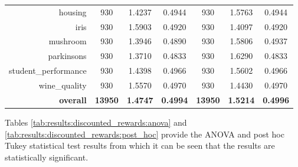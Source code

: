 \begin{table}[htbp]
{\begin{tabular}{rcccccc}
    housing & 930   & \cellcolor[rgb]{ .776,  .937,  .808}\textcolor[rgb]{ 0,  .38,  0}{1.4237} & 0.4944 & 930   & 1.5763 & 0.4944 \\
    iris  & 930   & 1.5903 & 0.4920 & 930   & \cellcolor[rgb]{ .776,  .937,  .808}\textcolor[rgb]{ 0,  .38,  0}{1.4097} & 0.4920 \\
    mushroom & 930   & \cellcolor[rgb]{ .776,  .937,  .808}\textcolor[rgb]{ 0,  .38,  0}{1.3946} & 0.4890 & 930   & 1.5806 & 0.4937 \\
    parkinsons & 930   & \cellcolor[rgb]{ .776,  .937,  .808}\textcolor[rgb]{ 0,  .38,  0}{1.3710} & 0.4833 & 930   & 1.6290 & 0.4833 \\
    student\_performance & 930   & \cellcolor[rgb]{ .776,  .937,  .808}\textcolor[rgb]{ 0,  .38,  0}{1.4398} & 0.4966 & 930   & 1.5602 & 0.4966 \\
    wine\_quality & 930   & 1.5570 & 0.4970 & 930   & \cellcolor[rgb]{ .776,  .937,  .808}\textcolor[rgb]{ 0,  .38,  0}{1.4430} & 0.4970 \\
    \midrule
    \textbf{overall} & \textbf{13950} & \cellcolor[rgb]{ .776,  .937,  .808}\textcolor[rgb]{ 0,  .38,  0}{\textbf{1.4747}} & \textbf{0.4994} & \textbf{13950} & \textbf{1.5214} & \textbf{0.4996} \\
    \end{tabular}%
    }
\end{table}%

Tables \ref{tab:results:discounted_rewards:anova} and \ref{tab:results:discounted_rewards:post_hoc} provide the ANOVA and post hoc Tukey statistical test results from which it can be seen that the results are statistically significant.


\begin{table}[htbp]
	\centering
	\caption{ANOVA - Rank - BHH Variant: Discounted Rewards}
	\label{tab:results:discounted_rewards:anova}%
	\par\bigskip
\end{table}


